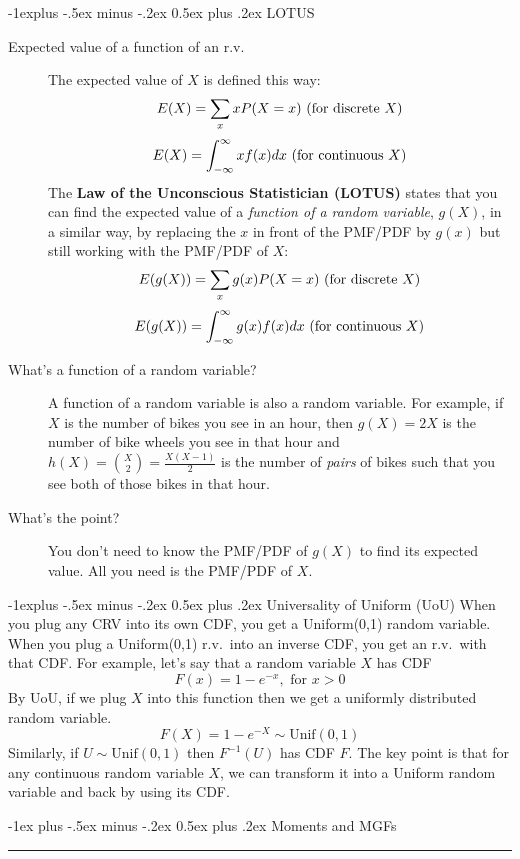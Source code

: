 \documentclass[10pt,landscape]{article}
\makeatletter
\renewcommand{\section}{\@startsection{section}{1}{0mm}%
                                {-1ex plus -.5ex minus -.2ex}%
                                {0.5ex plus .2ex}%
                                {\normalfont\large\bfseries}}
\renewcommand{\subsection}{\@startsection{subsection}{2}{0mm}%
                                {-1explus -.5ex minus -.2ex}%
                                {0.5ex plus .2ex}%
                                {\normalfont\normalsize\bfseries}}
\makeatother
\begin{document}
\begin{multicols*}{3}
\subsection{LOTUS}
\begin{description}
\item[Expected value of a function of an r.v.]
The expected value of $X$ is defined this way:
\[E(X) = \sum_x xP(X=x) \textnormal{ (for discrete $X$)}\]
\[E(X) = \int^\infty_{-\infty}xf(x)dx  \textnormal{ (for continuous $X$)}\]
The \textbf{Law of the Unconscious Statistician (LOTUS)} states that you can find the expected value of a \emph{function of a random variable}, $g(X)$, in a similar way, by replacing the $x$ in front of the PMF/PDF by $g(x)$ but still working with the PMF/PDF of $X$:
\[E(g(X)) = \sum_x g(x)P(X=x) \textnormal{ (for discrete $X$)}\]
\[E(g(X)) = \int^\infty_{-\infty}g(x)f(x)dx \textnormal{ (for continuous $X$)}\]
\item[What's a function of a random variable?] A function of a random variable is also a random variable. For example, if $X$ is the number of bikes you see in an hour, then $g(X) =  2X$ is the number of bike wheels you see in that hour and $h(X) = {X \choose 2} = \frac{X(X-1)}{2}$ is the number of \emph{pairs} of bikes such that you see both of those bikes in that hour.
\item[What's the point?] You don't need to know the PMF/PDF of $g(X)$ to find its expected value. All you need is the PMF/PDF of $X$. 
\end{description}

\subsection{Universality of Uniform (UoU)} When you plug any CRV into its own CDF, you get a Uniform(0,1) random variable. When you plug a Uniform(0,1) r.v.~into an inverse CDF, you get an r.v.~with that CDF. For example, let's say that a random variable $X$ has CDF
    \[ F(x) = 1 - e^{-x}, \textrm{ for $x>0$} \]
    By  UoU, if we plug $X$ into this function then we get a uniformly distributed random variable.
    \[ F(X) = 1 - e^{-X} \sim \textrm{Unif}(0,1)\]
    Similarly, if $U \sim \textrm{Unif}(0,1)$ then $F^{-1}(U)$ has CDF $F$. The key point is that {for any continuous random variable $X$, we can transform it into a Uniform random variable and back by using its CDF.}

\section{Moments and MGFs}\smallskip \hrule height 2pt \smallskip


\end{multicols*}
\end{document}
